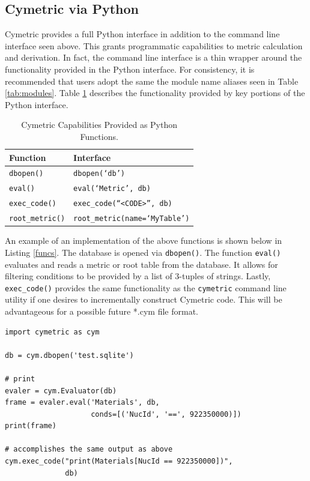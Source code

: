 \documentclass{anstrans}
\newcommand{\code}[1]{{\color{code}\texttt{#1}}}
\begin{document}
\subsection{Cymetric via Python}
Cymetric provides a full Python interface in addition to the command line 
interface seen above. This grants programmatic capabilities to metric 
calculation and derivation. In fact, the command line interface is a thin
wrapper around the functionality provided in the Python interface.
For consistency, it is recommended that users adopt the same the module name 
aliases seen in Table \ref{tab:modules}. 
Table \ref{tab:pyfunc} describes the functionality provided by key 
portions of the Python interface.

\begin{table}[htb]
\centering
\caption{Cymetric Capabilities Provided as Python Functions.}
\begin{tabular}{ll}
\toprule
  Function           & Interface                 \\
\midrule 
  \code{dbopen()}    & \code{dbopen(`db')}         \\
  \code{eval()}      & \code{eval(`Metric', db)}   \\
  \code{exec\_code()} & \code{exec\_code(``<CODE>'', db)}  \\ 
  \code{root\_metric()} & \code{root\_metric(name=`MyTable')}  \\
\bottomrule
\end{tabular}
\label{tab:pyfunc}
\end{table} 

An example of an implementation of the above functions is shown below in 
Listing \ref{funcs}. The database is opened via \code{dbopen()}. The 
function \code{eval()} evaluates and reads a metric or root table from the 
database. It allows for filtering conditions to be provided by a list of 
3-tuples of strings. 
Lastly, \code{exec\_code()} provides the same functionality as the
\code{cymetric} command line utility if one desires to incrementally construct Cymetric code. 
This will be advantageous for a possible future *.cym file format.

\begin{lstlisting}[caption ={Example Python Script Using Cymetric}, label=funcs]
import cymetric as cym

db = cym.dbopen('test.sqlite')

# print 
evaler = cym.Evaluator(db)
frame = evaler.eval('Materials', db, 
                    conds=[('NucId', '==', 922350000)])
print(frame)

# accomplishes the same output as above
cym.exec_code("print(Materials[NucId == 922350000])", 
              db)
\end{lstlisting}
\end{document}
